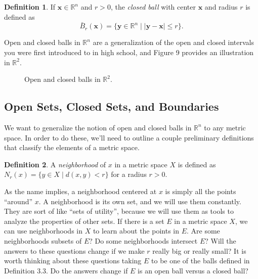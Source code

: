 \documentclass{article}
\newcommand{\R}{\mathbb{R}}
\newcommand{\x}{\mathbf{x}}
\newcommand{\y}{\mathbf{y}}
\theoremstyle{definition}
\newtheorem{definition}{Definition}[section]
\begin{document}
\begin{definition}
	If $ \x\in\R^n $ and $ r>0 $, the \textit{\color{red} closed ball} with center $ \x $ and radius $ r $ is defined as $$ \bar{B}_r(\x)=\{\y\in\R^n\mid|\y-\x|\le r\}. $$ 
\end{definition}
Open and closed balls in $ \R^n $ are a generalization of the open and closed intervals you were first introduced to in high school, and Figure 9 provides an illustration in $ \R^2 $. 
\begin{figure}[h!]
	\centering
	\caption{Open and closed balls in $ \R^2 $.}
\end{figure}  
\subsection{Open Sets, Closed Sets, and Boundaries}
We want to generalize the notion of open and closed balls in $ \R^n $ to any metric space. In order to do these, we'll need to outline a couple preliminary definitions that classify the elements of a metric space. 
\begin{definition}
	A \textit{\color{red}neighborhood } of $ x $ in a metric space $ X $ is defined as $ N_r(x)=\{y\in X\mid d(x,y)<r\} $ for a radius $ r>0 $.  
\end{definition}
As the name implies, a neighborhood centered at $ x $ is simply all the points ``around'' $ x $. A neighborhood is its own set, and we will use them constantly. They are sort of like ``sets of utility'', because we will use them as tools to analyze the properties of other sets. If there is a set $ E $ in a metric space $ X $, we can use neighborhoods in $ X $ to learn about the points in $ E $. Are some neighborhoods subsets of $ E $? Do some neighborhoods intersect $ E $? Will the answers to these questions change if we make $ r $ really big or really small? It is worth thinking about these questions taking $ E $ to be one of the balls defined in Definition 3.3. Do the answers change if $ E $ is an open ball versus a closed ball? 
\end{document}
